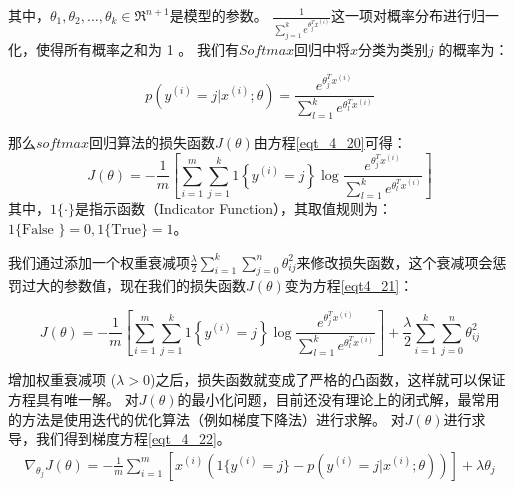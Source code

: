 其中，$\theta_1, \theta_2, \ldots, \theta_k \in \Re^{n+1}$是模型的参数。
$\frac{1}{ \sum_{j=1}^{k}{e^{ \theta_j^T x^{(i)} }} }$这一项对概率分布进行归一化，使得所有概率之和为 1 。
我们有$Softmax$回归中将$x$分类为类别$j$ 的概率为：\par
\begin{equation}
p(y^{(i)} = j | x^{(i)} ; \theta) = \frac{e^{\theta_j^T x^{(i)}}}{\sum_{l=1}^k e^{ \theta_l^T x^{(i)}} }
\end{equation}

那么$softmax$回归算法的损失函数$J(\theta)$由方程\eqref{eqt_4_20}可得：
\begin{equation}
	\label{eqt_4_20}
	J(\theta) = - \frac{1}{m} \left[ \sum_{i=1}^{m} \sum_{j=1}^{k}  1\left\{y^{(i)} = j\right\} \log \frac{e^{\theta_j^T x^{(i)}}}{\sum_{l=1}^k e^{ \theta_l^T x^{(i)} }}\right]
\end{equation}
其中，$1\{\cdot\}$是指示函数（Indicator Function），其取值规则为：$1\{ \text{False }\}=0, 1\{ \text{True} \}=1$。\par

我们通过添加一个权重衰减项$\frac{\lambda}{2} \sum_{i=1}^k \sum_{j=0}^{n} \theta_{ij}^2$来修改损失函数，这个衰减项会惩罚过大的参数值，现在我们的损失函数$J(\theta)$变为方程\eqref{eqt4_21}：\par
\begin{equation}
	\label{eqt4_21}
	J(\theta) = - \frac{1}{m} \left[ \sum_{i=1}^{m} \sum_{j=1}^{k} 1\left\{y^{(i)} 
	= j\right\} \log \frac{e^{\theta_j^T x^{(i)}}}{\sum_{l=1}^k e^{ \theta_l^T x^{(i)} }}  \right]
	+ \frac{\lambda}{2} \sum_{i=1}^k \sum_{j=0}^n \theta_{ij}^2
\end{equation}

增加权重衰减项 ($\lambda > 0$)之后，损失函数就变成了严格的凸函数，这样就可以保证方程具有唯一解。
对$J(\theta)$的最小化问题，目前还没有理论上的闭式解，最常用的方法是使用迭代的优化算法（例如梯度下降法）进行求解。
对$J(\theta)$进行求导，我们得到梯度方程\eqref{eqt_4_22}。
\begin{align}
	\label{eqt_4_22}
	\nabla_{\theta_j} J(\theta) = - \frac{1}{m} \sum_{i=1}^{m}{ \left[ x^{(i)} ( 1\{ y^{(i)} = j\}  - p(y^{(i)} = j | x^{(i)}; \theta) ) \right]  } + \lambda \theta_j
\end{align}


